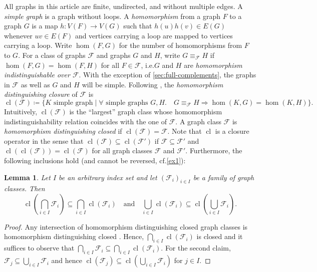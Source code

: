 \documentclass[3p,final]{elsarticle}
\DeclareMathOperator{\cl}{cl}
\newtheorem{lemma}[theorem]{Lemma}
\begin{document}
	All graphs in this article are finite, undirected, and without multiple edges. 
	A \emph{simple graph} is a graph without loops.
	A \emph{homomorphism} from a graph $F$ to a graph $G$ is a map $h \colon V(F) \to V(G)$ such that $h(u)h(v) \in E(G)$ whenever $uv \in E(F)$ and vertices carrying a loop are mapped to vertices carrying a loop. Write $\hom(F, G)$ for the number of homomorphisms from $F$ to $G$. 
	For a class of graphs $\mathcal{F}$ and graphs $G$ and $H$, write $G \equiv_{\mathcal{F}} H$ if $\hom(F, G) = \hom(F, H)$ for all $F \in \mathcal{F}$, i.e.\@ $G$ and $H$ are \emph{homomorphism indistinguishable over $\mathcal{F}$}.
	With the exception of \cref{sec:full-complements}, the graphs in $\mathcal{F}$ as well as $G$ and $H$ will be simple.
	Following \cite{roberson_oddomorphisms_2022}, the \emph{homomorphism distinguishing closure} of $\mathcal{F}$ is
	\[
		\cl(\mathcal{F}) \coloneqq \{K \text{ simple graph} \mid \forall  \text{ simple graphs } G, H.\quad G \equiv_{\mathcal{F}} H \Rightarrow \hom(K, G) = \hom(K, H) \}.
	\]
	Intuitively, $\cl(\mathcal{F})$ is the \enquote{largest} graph class whose homomorphism indistinguishability relation coincides with the one of $\mathcal{F}$.
	A graph class $\mathcal{F}$ is \emph{homomorphism distinguishing closed} if $\cl(\mathcal{F}) = \mathcal{F}$. Note that $\cl$ is a closure operator in the sense that $\cl(\mathcal{F}) \subseteq \cl(\mathcal{F}')$ if $\mathcal{F} \subseteq \mathcal{F}'$ and $\cl(\cl(\mathcal{F})) = \cl(\mathcal{F})$ for all graph classes $\mathcal{F}$ and $\mathcal{F}'$.
	Furthermore, the following inclusions hold (and cannot be reversed, cf.\@ \cref{ex1}):
	
	\begin{lemma} \label{lem:intersection}
		Let $I$ be an arbitrary index set and let $(\mathcal{F}_i)_{i \in I}$ be a family of graph classes.
		Then 
		\[
			\cl\left(\bigcap_{i\in I} \mathcal{F}_i \right) \subseteq \bigcap_{i \in I} \cl(\mathcal{F}_i) \quad \text{and} \quad
			\bigcup_{i\in I} \cl(\mathcal{F}_i) \subseteq \cl\left( \bigcup_{i\in I} \mathcal{F}_i \right).
		\]
	\end{lemma}
	\begin{proof}
		Any intersection of homomorphism distinguishing closed graph classes is homomorphism distinguishing closed \cite[Lemma~6.1]{roberson_oddomorphisms_2022}. Hence, $\bigcap_{i \in I} \cl(\mathcal{F}_i)$ is closed and it suffices to observe that $\bigcap_{i \in I} \mathcal{F}_i \subseteq \bigcap_{i \in I} \cl(\mathcal{F}_i)$.
		For the second claim, $\mathcal{F}_j \subseteq \bigcup_{i\in I} \mathcal{F}_i$ and hence $\cl(\mathcal{F}_j) \subseteq \cl(\bigcup_{i\in I} \mathcal{F}_i)$ for $j\in I$.
	\end{proof}
	
\end{document}
